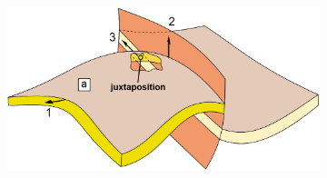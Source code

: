 		\begin{figure}[h]
			\begin{subfigure}{.8\textwidth}
				\centering
				\includegraphics[width=1\linewidth]{Figures/fault_trap_mechA1}
			\end{subfigure}
			\begin{subfigure}{0.18\textwidth}
				\centering

\end{subfigure}
\end{figure}
